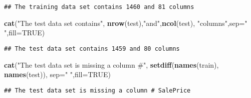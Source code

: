 \documentclass[]{article}
\newenvironment{Shaded}{\begin{snugshade}}{\end{snugshade}}
\newcommand{\KeywordTok}[1]{\textcolor[rgb]{0.13,0.29,0.53}{\textbf{#1}}}
\newcommand{\DataTypeTok}[1]{\textcolor[rgb]{0.13,0.29,0.53}{#1}}
\newcommand{\StringTok}[1]{\textcolor[rgb]{0.31,0.60,0.02}{#1}}
\newcommand{\OtherTok}[1]{\textcolor[rgb]{0.56,0.35,0.01}{#1}}
\newcommand{\OperatorTok}[1]{\textcolor[rgb]{0.81,0.36,0.00}{\textbf{#1}}}
\newcommand{\NormalTok}[1]{#1}
\begin{document}
\begin{verbatim}
## The training data set contains 1460 and 81 columns
\end{verbatim}

\begin{Shaded}
\begin{Highlighting}[]
\KeywordTok{cat}\NormalTok{(}\StringTok{"The test data set contains"}\NormalTok{, }\KeywordTok{nrow}\NormalTok{(test),}\StringTok{"and"}\NormalTok{,}\KeywordTok{ncol}\NormalTok{(test), }\StringTok{"columns"}\NormalTok{,}\DataTypeTok{sep=}\StringTok{" "}\NormalTok{,}\DataTypeTok{fill=}\OtherTok{TRUE}\NormalTok{)}
\end{Highlighting}
\end{Shaded}

\begin{verbatim}
## The test data set contains 1459 and 80 columns
\end{verbatim}

\begin{Shaded}
\begin{Highlighting}[]
\KeywordTok{cat}\NormalTok{(}\StringTok{"The test data set is missing a column #"}\NormalTok{, }\KeywordTok{setdiff}\NormalTok{(}\KeywordTok{names}\NormalTok{(train), }\KeywordTok{names}\NormalTok{(test)), }\DataTypeTok{sep=}\StringTok{" "}\NormalTok{,}\DataTypeTok{fill=}\OtherTok{TRUE}\NormalTok{)}
\end{Highlighting}
\end{Shaded}

\begin{verbatim}
## The test data set is missing a column # SalePrice
\end{verbatim}

\begin{Shaded}
\end{Shaded}
\end{document}
